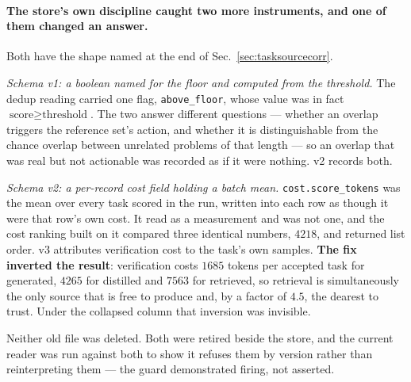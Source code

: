 \paragraph{The store's own discipline caught two more instruments, and one of them changed an
answer.} Both have the shape named at the end of Sec.~\ref{sec:tasksourcecorr}.

\emph{Schema v1: a boolean named for the floor and computed from the threshold.} The dedup
reading carried one flag, \texttt{above\_floor}, whose value was in fact
$\text{score} \ge \text{threshold}$. The two answer different questions --- whether an overlap
triggers the reference set's action, and whether it is distinguishable from the chance overlap
between unrelated problems of that length --- so an overlap that was real but not actionable
was recorded as if it were nothing. v2 records both.

\emph{Schema v2: a per-record cost field holding a batch mean.} \texttt{cost.score\_tokens} was
the mean over every task scored in the run, written into each row as though it were that row's
own cost. It read as a measurement and was not one, and the cost ranking built on it compared
three identical numbers, $4218$, and returned list order. v3 attributes verification cost to
the task's own samples. \textbf{The fix inverted the result}: verification costs $1685$ tokens
per accepted task for generated, $4265$ for distilled and $7563$ for retrieved, so retrieval is
simultaneously the only source that is free to produce and, by a factor of $4.5$, the dearest
to trust. Under the collapsed column that inversion was invisible.

Neither old file was deleted. Both were retired beside the store, and the current reader was
run against both to show it refuses them by version rather than reinterpreting them --- the
guard demonstrated firing, not asserted.

